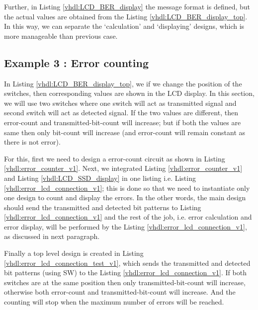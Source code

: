 Further, in Listing  \ref{vhdl:LCD_BER_display} the message format is defined, but the actual values are obtained from the Listing \ref{vhdl:LCD_BER_display_top}. In this way, we can separate the `calculation' and `displaying' designs, which is more manageable than previous case. 





\subsection{Example 3 : Error counting}
In Listing \ref{vhdl:LCD_BER_display_top}, we if we change the position of the switches, then corresponding values are shown in the LCD display. In this section, we will use two switches where one switch will act as transmitted signal and second switch will act as detected signal. If the two values are different, then error-count and transmitted-bit-count will increase; but if both the values are same then only bit-count will increase (and error-count will remain constant as there is not error). 

For this, first we need to design a error-count circuit as shown in Listing \ref{vhdl:error_counter_v1}. Next, we integrated Listing \ref{vhdl:error_counter_v1} and Listing \ref{vhdl:LCD_SSD_display} in one listing i.e. Listing \ref{vhdl:error_lcd_connection_v1}; this is done so that we need to instantiate only one design to count and display the errors. In the other words, the main design should send the transmitted and detected bit patterns to Listing \ref{vhdl:error_lcd_connection_v1} and the rest of the job, i.e. error calculation and error display, will be performed by the Listing \ref{vhdl:error_lcd_connection_v1}, as discussed in next paragraph.

Finally a top level design is created in Listing \ref{vhdl:error_lcd_connection_test_v1}, which sends the transmitted and detected bit patterns (using SW) to the Listing \ref{vhdl:error_lcd_connection_v1}. If both switches are at the same position then only transmitted-bit-count will increase, otherwise both error-count and transmitted-bit-count will increase.  And the counting will stop when the maximum number of errors will be reached.

